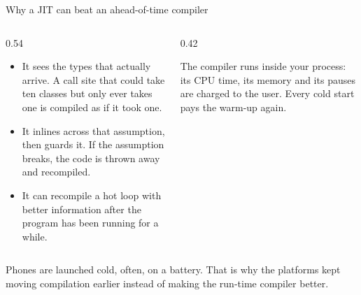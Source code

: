 \documentclass[10pt,aspectratio=169,t]{beamer}
\begin{document}
\begin{frame}[eyebrow=Compilation]{Why a JIT can beat an ahead-of-time compiler}
  \vskip 2mm
  \begin{columns}[T]
    \begin{column}{0.54\textwidth}
      \begin{itemize}
        \item It sees the types that actually arrive. A call site that could take ten classes but only ever takes one is compiled as if it took one.
        \item It inlines across that assumption, then guards it. If the assumption breaks, the code is thrown away and recompiled.
        \item It can recompile a hot loop with better information after the program has been running for a while.
      \end{itemize}
    \end{column}
    \begin{column}{0.42\textwidth}
      \begin{warning}
        The compiler runs inside your process: its CPU time, its memory and its pauses are charged to the user. Every cold start pays the warm-up again.
      \end{warning}
    \end{column}
  \end{columns}
  \begin{takeaway}{Phones are launched cold, often, on a battery.}
    That is why the platforms kept moving compilation earlier instead of making the run-time compiler better.
  \end{takeaway}
\end{frame}
\end{document}
